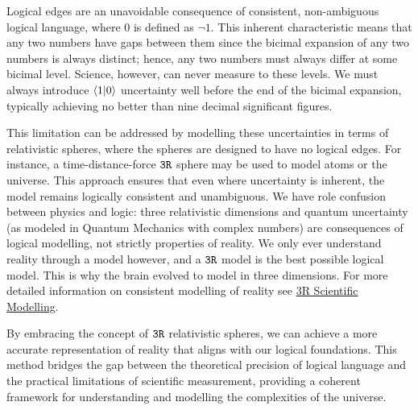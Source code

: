 \documentclass{article}
\begin{document}
Logical edges are an unavoidable consequence of consistent, non-ambiguous logical language, where 0 is defined as \(\neg 1\). This inherent characteristic means that any two numbers have gaps between them since the bicimal expansion of any two numbers is always distinct; hence, any two numbers must always differ at some bicimal level. Science, however, can never measure to these levels. We must always introduce $\langle 1 | 0 \rangle$ uncertainty well before the end of the bicimal expansion, typically achieving no better than nine decimal significant figures.

This limitation can be addressed by modelling these uncertainties in terms of relativistic spheres, where the spheres are designed to have no logical edges. For instance, a time-distance-force $\texttt{3R}$ sphere may be used to model atoms or the universe. This approach ensures that even where uncertainty is inherent, the model remains logically consistent and unambiguous. We have role confusion between physics and logic: three relativistic dimensions and quantum uncertainty (as modeled in Quantum Mechanics with complex numbers) are consequences of logical modelling, not strictly properties of reality. We only ever understand reality through a model however, and a $\texttt{3R}$ model is the best possible logical model. This is why the brain evolved to model in three dimensions. For more detailed information on consistent modelling of reality see \href{https://www.researchgate.net/publication/379035220_3R_Scientific_Modelling}{3R Scientific Modelling}.

By embracing the concept of $\texttt{3R}$ relativistic spheres, we can achieve a more accurate representation of reality that aligns with our logical foundations. This method bridges the gap between the theoretical precision of logical language and the practical limitations of scientific measurement, providing a coherent framework for understanding and modelling the complexities of the universe.
\end{document}
